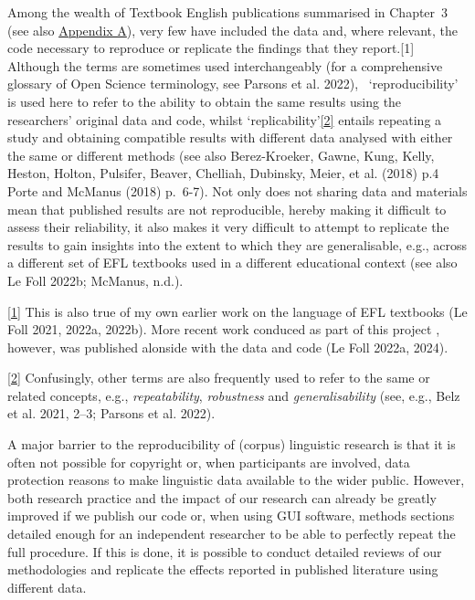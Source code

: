 \documentclass[
  letterpaper,
  DIV=11,
  numbers=noendperiod]{scrreprt}
\begin{document}
Among the wealth of Textbook English publications summarised in
Chapter~3 (see also
\href{https://elenlefoll.github.io/TextbookMDA/AppendixA.html}{Appendix
A}), very few have included the data and, where relevant, the code
necessary to reproduce or replicate the findings that they
report.{[}1{]} Although the terms are sometimes used interchangeably
(for a comprehensive glossary of Open Science terminology, see Parsons
et al. 2022), ~`reproducibility' is used here to refer to the ability to
obtain the same results using the researchers' original data and code,
whilst `replicability'\hyperref[_ftn2]{{[}2{]}} entails repeating a
study and obtaining compatible results with different data analysed with
either the same or different methods (see also Berez-Kroeker, Gawne,
Kung, Kelly, Heston, Holton, Pulsifer, Beaver, Chelliah, Dubinsky,
Meier, et al. (2018) p.4 Porte and McManus (2018) p.~6-7). Not only does
not sharing data and materials mean that published results are not
reproducible, hereby making it difficult to assess their reliability, it
also makes it very difficult to attempt to replicate the results to gain
insights into the extent to which they are generalisable, e.g., across a
different set of EFL textbooks used in a different educational context
(see also Le Foll 2022b; McManus, n.d.).

\hyperref[_ftnref1]{{[}1{]}} This is also true of my own earlier work on
the language of EFL textbooks (Le Foll 2021, 2022a, 2022b). More recent
work conduced as part of this project , however, was published alonside
with the data and code (Le Foll 2022a, 2024).

\hyperref[_ftnref2]{{[}2{]}} Confusingly, other terms are also
frequently used to refer to the same or related concepts, e.g.,
\emph{repeatability}, \emph{robustness} and \emph{generalisability}
(see, e.g., Belz et al. 2021, 2--3; Parsons et al. 2022).

A major barrier to the reproducibility of (corpus) linguistic research
is that it is often not possible for copyright or, when participants are
involved, data protection reasons to make linguistic data available to
the wider public. However, both research practice and the impact of our
research can already be greatly improved if we publish our code or, when
using GUI software, methods sections detailed enough for an independent
researcher to be able to perfectly repeat the full procedure. If this is
done, it is possible to conduct detailed reviews of our methodologies
and replicate the effects reported in published literature using
different data.
\end{document}
